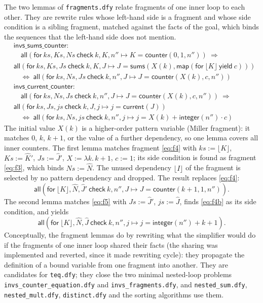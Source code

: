 \documentclass[11pt,a4paper]{article}
\newcommand{\bl}[1]{\lfloor #1\rfloor}                       %
\newcommand{\mapc}[2]{\mathsf{map}(\mathsf{for}\ #1\ \mathsf{yield}\ #2)}
\newcommand{\al}[2]{\mathsf{all}(\mathsf{for}\ #1\ \mathsf{check}\ #2)}
\newcommand{\cnt}{\mathsf{counter}}
\newcommand{\cur}{\mathsf{current}}
\newcommand{\intf}{\mathsf{integer}}
\newcommand{\sums}{\mathsf{sums}}
\newcommand{\lemma}[1]{\textsf{#1}}
\newcommand{\seq}[1]{\hat{#1}}                               %
\begin{document}
The two lemmas of \texttt{fragments.dfy} relate fragments of one inner loop to each other. They are
rewrite rules whose left-hand side is a fragment and whose side condition is a sibling fragment, matched
against the facts of the goal, which binds the sequences that the left-hand side does not mention.
\begin{align*}
  &\lemma{invs\_sums\_counter}:\\
  &\quad \al{ks, Ks, Ns}{k, K, n'' \mapsto K = \cnt(0, 1, n'')}\ \Longrightarrow \\
  &\al{ks, Ks, Js}{k, K, J \mapsto J = \sums(X(k), \mapc{\bl{K}}{c})}\\
  &\quad\Longleftrightarrow\ \al{ks, Ns, Js}{k, n'', J \mapsto J = \cnt(X(k), c, n'')}\\[4pt]
  &\lemma{invs\_current\_counter}:\\
  &\quad \al{ks, Ns, Js}{k, n'', J \mapsto J = \cnt(X(k), c, n'')}\ \Longrightarrow \\
  &\al{ks, Js, js}{k, J, j \mapsto j = \cur(J)}\\
  &\quad\Longleftrightarrow\ \al{ks, Ns, js}{k, n'', j \mapsto j = X(k) + \intf(n'') \cdot c}
\end{align*}
The initial value $X(k)$ is a higher-order pattern variable (Miller fragment): it matches $0$, $k$,
$k + 1$, or the value of a further dependency, so one lemma covers all inner counters. The first lemma
matches fragment \eqref{eq:f4} with $ks := \bl{K}$, $Ks := \seq{K}'$, $Js := \seq{J}'$,
$X := \lambda k.\, k + 1$, $c := 1$; its side condition is found as fragment \eqref{eq:f3}, which binds
$Ns := \seq{N}$. The unused dependency $\bl{I}$ of the fragment is selected by no pattern dependency and
dropped. The result replaces \eqref{eq:f4}:
\begin{equation}
  \al{\bl{K}, \seq{N}, \seq{J}'}{k, n'', J \mapsto J = \cnt(k + 1, 1, n'')}. \label{eq:f4b}
\end{equation}
The second lemma matches \eqref{eq:f5} with $Js := \seq{J}'$, $js := \seq{J}$, finds \eqref{eq:f4b} as its
side condition, and yields
\begin{equation}
  \al{\bl{K}, \seq{N}, \seq{J}}{k, n'', j \mapsto j = \intf(n'') + k + 1}. \label{eq:f5b}
\end{equation}
Conceptually, the fragment lemmas do by rewriting what the simplifier would do if the fragments of one
inner loop shared their facts (the sharing was implemented and reverted, since it made rewriting cycle):
they propagate the definition of a bound variable from one fragment into another. They are candidates for
\texttt{teq.dfy}; they close the two minimal nested-loop problems \texttt{invs\_counter\_equation.dfy} and
\texttt{invs\_fragments.dfy}, and \texttt{nested\_sum.dfy}, \texttt{nested\_mult.dfy},
\texttt{distinct.dfy} and the sorting algorithms use them.
\end{document}

